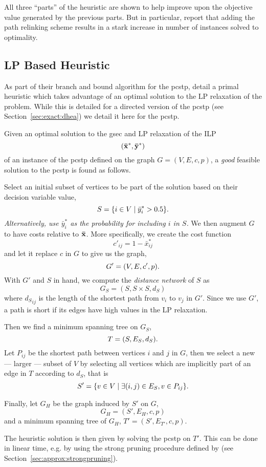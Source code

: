 All three ``parts'' of the heuristic are shown to help improve upon the
objective value generated by the previous parts.
But in particular, \citeauthor{canuto2001local} report that adding the
path relinking scheme results in a stark increase
 in number of instances solved to optimality.

 \subsection{LP Based Heuristic}
 \label{sec:heuristics:lp}
 As part of their branch and bound algorithm for the \gls{pcstp}, \citet{ljubic2005solving} detail a primal
 heuristic which takes advantage of an optimal solution to the LP relaxation of the problem. While this
 is detailed for a directed version of the \gls{pcstp} (see Section~\ref{sec:exact:dhea}) we detail it
 here for the \gls{pcstp}.
 
 Given an optimal solution to the \gls{gsec} and LP relaxation of the ILP
 \[(\mathbf{ \bar x^*}, \mathbf{\bar y^*})\]
 of an instance of the \gls{pcstp} defined on the graph $G = (V, E, c, p)$,
 a \textit{good} feasible solution to the \gls{pcstp} is found as follows.

 Select an initial subset of vertices to be part of the solution based on their decision variable value,
 \[S = \{ i \in V \mid \bar y^*_i > 0.5 \}\mathnormal{.}\]
 \textit{Alternatively, use $\bar y^*_i$ as the probability for including $i$ in $S$.}
 We then augment $G$ to have costs relative to $\mathbf{\bar{x}}$. More specifically,
 we create the cost function
 \[c'_{ij} = 1 - \bar{x}^*_{ij}\]
 and let it replace $c$ in $G$ to give us the graph,
 \[G' = (V, E, c', p)\mathnormal{.}\]
 With $G'$ and $S$ in hand, we compute the \textit{distance network} of $S$ as
 \[G_S = (S, S \times S, d_S)\]
 where ${d_S}_{ij}$ is the length of the shortest path from $v_i$ to $v_j$ in $G'$.
 Since we use $G'$, a path is short if its edges have high values in the LP
 relaxation.

 Then we find a minimum spanning tree on $G_S$,
 \[T = (S, E_S, d_S) \mathnormal{.}\]
 Let $P_{ij}$ be the shortest path between vertices $i$ and $j$ in $G$, then
 we select a new --- larger --- subset of $V$ by selecting all vertices which
 are implicitly part of an edge in $T$ according to $d_S$, that is
 \[S' = \{ v \in V \mid \exists (i,j) \in E_S, v \in P_{ij}\}\mathnormal{.}\]

 Finally, let $G_H$ be the graph induced by $S'$ on $G$,
 \[G_H = (S', E_H, c, p)\]
 and a minimum spanning tree of $G_H$, $T' = (S', E_{T'}, c, p)$.

 The heuristic solution is then given by solving the \gls{pcstp}
 on $T'$. This can be done in linear time, e.g. by using the
 strong pruning procedure defined by
 \citet{Johnson:2000:PCS:338219.338637}
 (see Section~\ref{sec:approx:strongpruning}).

 
 
 
